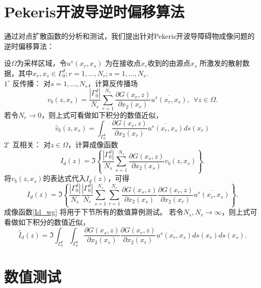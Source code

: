 \section{Pekeris开波导逆时偏移算法}
通过对点扩散函数的分析和测试，我们提出针对Pekeris开波导障碍物成像问题的逆时偏移算法：
\begin{algorithm}\label{alg_wg}
设$\Omega$为采样区域，令$u^s(x_r,x_s)$ 为在接收点$x_r$收到的由源点$x_s$ 所激发的散射数据，其中$x_r,x_s\in\Gamma_0^d;r=1,\ldots,N_r;s=1,\ldots,N_s$.\\
$1^\circ$ 反传播： 对$s=1,\ldots,N_s$，计算反传播场
\begin{equation}
  v_b(z,x_s)=\frac{|\Gamma_0^d|}{N_r}\sum\limits_{r=1}^{N_r}\frac{\partial G(x_r,z)}{\partial x_2(x_r)}\overline{u^s(x_r,x_s)},\  \  \forall z\in\Omega.
\end{equation}
若令$N_r\rightarrow0$，则上式可看做如下积分的数值近似，
\begin{equation}
  \hat v_b(z,x_s)=\int_{\Gamma_0^d}\frac{\partial G(x_r,z)}{\partial x_2(x_r)}\overline{u^s(x_r,x_s)}ds(x_r)
\end{equation}
$2^\circ$ 互相关： 对$z\in\Omega$，计算成像函数
\begin{equation}
  I_d(z)=\Im\left\{\frac{|\Gamma_0^d|}{N_s}\sum\limits_{s=1}^{N_s}\frac{\partial G(x_s,z)}{\partial x_2(x_s)}v_b(z,x_s)
  \right\}.
\end{equation}
将$v_b(z,x_s)$的表达式代入$I_d(z)$，可得
\begin{equation}\label{Id_wg}
  I_d(z)=\Im\left\{\frac{|\Gamma_0^d|}{N_s}\frac{|\Gamma_0^d|}{N_r}\sum\limits_{s=1}^{N_s}\sum\limits_{r=1}^{N_r}\frac{\partial G(x_s,z)}{\partial x_2(x_s)}\frac{\partial G(x_r,z)}{\partial x_2(x_r)}\overline{u^s(x_r,x_s)}
  \right\}.
\end{equation}
成像函数\eqref{Id_wg} 将用于下节所有的数值算例测试。
若令$N_s,N_r\rightarrow\infty$，则上式可看做如下积分的数值近似，
\begin{equation}\label{Id_wg_hat}
  \hat I_d(z)=\Im\int_{\Gamma_0^d}\int_{\Gamma_0^d}\frac{\partial G(x_s,z)}{\partial x_2(x_s)}
  \frac{\partial G(x_r,z)}{\partial x_2(x_r)}\overline{u^s(x_r,x_s)}ds(x_r)ds(x_s).
\end{equation}
\end{algorithm}

\section{数值测试}

